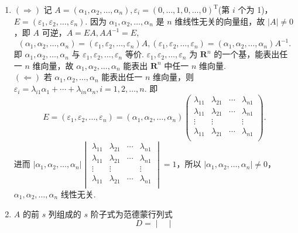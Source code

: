 \begin{enumerate}
    \item $(\Rightarrow)$ 记 $A = (\alpha_1, \alpha_2, \ldots, \alpha_n), \varepsilon _i = (0, \ldots, 1, 0, \ldots, 0)^{\mathrm{T}}$(第 $i$ 个为 1)，$E = (\varepsilon _1, \varepsilon _2, \ldots, \varepsilon _n)$. 因为 $\alpha_1, \alpha_2, \ldots, \alpha_n$ 是 $n$ 维线性无关的向量组，故 $\lvert A \rvert \neq 0$，即 $A$ 可逆，$A = EA, AA^{-1} = E$,\[(\alpha_1, \alpha_2, \ldots, \alpha_n) = (\varepsilon _1, \varepsilon _2, \ldots, \varepsilon _n)A, (\varepsilon _1, \varepsilon _2, \ldots, \varepsilon _n) = (\alpha_1, \alpha_2, \ldots, \alpha_n)A^{-1}.\] 即 $\alpha_1, \alpha_2, \ldots, \alpha_n$ 与 $\varepsilon _1, \varepsilon _2, \ldots, \varepsilon _n$ 等价. $\varepsilon _1, \varepsilon _2, \ldots, \varepsilon _n$ 为 $\mathbf{R}^n$ 的一个基，能表出任一 $n$ 维向量，故 $\alpha_1, \alpha_2, \ldots, \alpha_n$ 能表出 $\mathbf{R}^n$ 中任一 $n$ 维向量.  \\
    $(\Leftarrow)$ 若 $\alpha_1, \alpha_2, \ldots, \alpha_n$ 能表出任一 $n$ 维向量，则 $\varepsilon_i = \lambda_{i1}\alpha_1+\cdots+\lambda_{in}\alpha_n, i = 1, 2, \ldots, n$. 即 \[E = (\varepsilon _1, \varepsilon _2, \ldots, \varepsilon _n) = (\alpha_1, \alpha_2, \ldots, \alpha_n)\begin{pmatrix}
        \lambda_{11} & \lambda_{21} & \cdots & \lambda_{n1} \\
        \lambda_{11} & \lambda_{21} & \cdots & \lambda_{n1} \\
        \vdots       & \vdots       &        & \vdots       \\
        \lambda_{11} & \lambda_{21} & \cdots & \lambda_{n1} \\
    \end{pmatrix}.\] 进而 $\lvert \alpha_1, \alpha_2, \ldots, \alpha_n \rvert \begin{vmatrix}
        \lambda_{11} & \lambda_{21} & \cdots & \lambda_{n1} \\
        \lambda_{11} & \lambda_{21} & \cdots & \lambda_{n1} \\
        \vdots       & \vdots       &        & \vdots       \\
        \lambda_{11} & \lambda_{21} & \cdots & \lambda_{n1} \\
    \end{vmatrix} = 1$，所以 $\lvert \alpha_1, \alpha_2, \ldots, \alpha_n \rvert \neq 0$，$\alpha_1, \alpha_2, \ldots, \alpha_n$ 线性无关.
    \item $A$ 的前 $s$ 列组成的 $s$ 阶子式为范德蒙行列式 \[D = \begin{vmatrix}

\end{vmatrix}\]
\end{enumerate}
